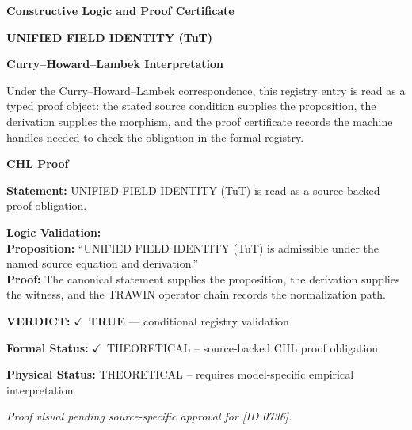 \clearpage
\begingroup\tzpsupportsetup
\noindent\textbf{\fontsize{10.8pt}{12.8pt}\selectfont [ID 0736] Constructive Logic and Proof Certificate}\par
\noindent\textbf{\fontsize{10pt}{12pt}\selectfont UNIFIED FIELD IDENTITY (TuT)}\par
\vspace{0.45em}
\begingroup
\footnotesize
\setlength{\parskip}{0.22em}
\setlength{\parindent}{0pt}
\noindent\textbf{Curry--Howard--Lambek Interpretation}\par
Under the Curry--Howard--Lambek correspondence, this registry entry is read as a typed proof
object: the stated source condition supplies the proposition, the derivation supplies the
morphism, and the proof certificate records the machine handles needed to check the obligation
in the formal registry.

\vspace{0.45em}
\noindent\textbf{CHL Proof}\par
\textbf{Statement:} UNIFIED FIELD IDENTITY (TuT) is read as a source-backed proof obligation.

\textbf{Logic Validation:}\\
\textbf{Proposition:} ``UNIFIED FIELD IDENTITY (TuT) is admissible under the named source equation and derivation.''\\
\textbf{Proof:} The canonical statement supplies the proposition, the derivation supplies the witness, and the TRAWIN operator chain records the normalization path.

\textbf{VERDICT:} \ensuremath{\checkmark}\ \textbf{TRUE} --- conditional registry validation

\textbf{Formal Status:} \ensuremath{\checkmark}\ THEORETICAL -- source-backed CHL proof obligation

\textbf{Physical Status:} THEORETICAL -- requires model-specific empirical interpretation
\par\vspace{0.45em}
\par
\vfill
\begingroup\footnotesize\itshape
Proof visual pending source-specific approval for [ID 0736].
\par\endgroup
\vfill
\endgroup
\endgroup
